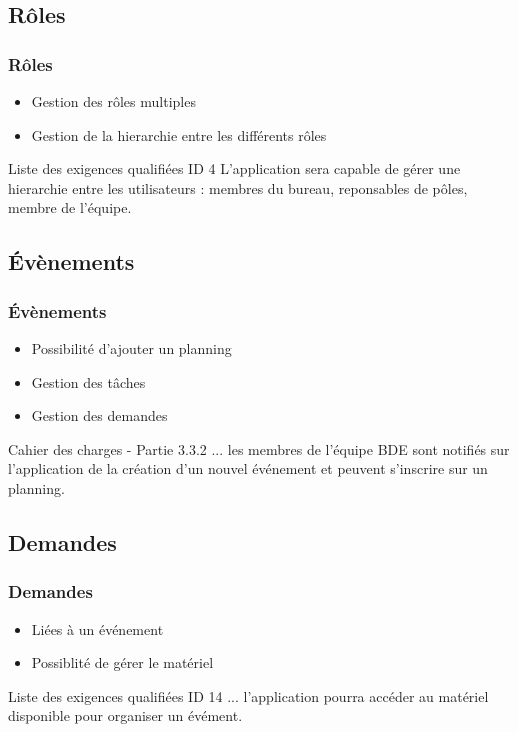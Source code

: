 \documentclass[handout]{beamer}
\begin{document}
	\subsection{Rôles}
	\begin{frame}
		\frametitle{Rôles}

		\begin{itemize}
			\item Gestion des rôles multiples
			\item Gestion de la hierarchie entre les différents rôles
		\end{itemize}

		\begin{exampleblock}{Liste des exigences qualifiées ID 4}
			L'application sera capable de gérer une hierarchie entre les utilisateurs : membres du bureau, reponsables de pôles, membre de l'équipe.
		\end{exampleblock}
	\end{frame}

	\subsection{Évènements}
	\begin{frame}
		\frametitle{Évènements}

		\begin{itemize}
			\item Possibilité d'ajouter un planning
			\item Gestion des tâches
			\item Gestion des demandes
		\end{itemize}

		\begin{exampleblock}{Cahier des charges - Partie 3.3.2}
			... les membres de l'équipe BDE sont notifiés sur l'application de la création d'un nouvel événement et peuvent s'inscrire sur un planning.
		\end{exampleblock}
	\end{frame}

	\subsection{Demandes}
	\begin{frame}
		\frametitle{Demandes}

		\begin{itemize}
			\item Liées à un événement
			\item Possiblité de gérer le matériel
		\end{itemize}

		\begin{exampleblock}{Liste des exigences qualifiées  ID 14}
			... l'application pourra accéder au matériel disponible pour organiser un évément.
		\end{exampleblock}
	\end{frame}
\end{document}
